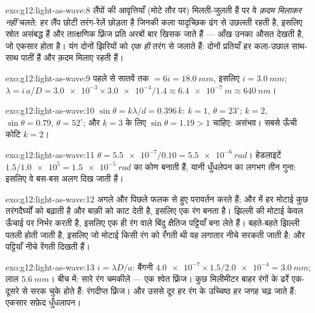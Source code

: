\begin{solution}{exo:g12:light-as-wave:8}
लैंपों की आवृत्तियाँ (मोटे तौर पर) मिलती-जुलती हैं पर वे \emph{क़दम मिलाकर
नहीं} चलते: हर लैंप छोटी तरंग-रेलें छोड़ता है जिनकी कला यादृच्छिक ढंग
से उछलती रहती है, इसलिए स्रोत असंबद्ध हैं और तात्क्षणिक फ़्रिंज प्रति 
अरबों बार खिसक जाते हैं --- आँख उनका औसत देखती है, जो एकसार होता है। यंग
दोनों झिरियों को \emph{एक ही} तरंग से जलाते हैं: दोनों प्रतियाँ हर
कला-उछाल साथ-साथ पातीं हैं और क़दम मिलाए रहती हैं।
\end{solution}

\begin{solution}{exo:g12:light-as-wave:9}
पहले से सातवें तक $= 6i = \qty{18.0}{mm}$, इसलिए $i = \qty{3.0}{mm}$; $\lambda = i\,a/D = \num{3.0e-3} \times \num{3.0e-4}/1.4 \approx
\qty{6.4e-7}{m} \approx \qty{640}{nm}$।
\end{solution}

\begin{solution}{exo:g12:light-as-wave:10}
$\sin\theta = k\lambda/d = 0.396\,k$: $k = 1$, $\theta = 23^\circ$; $k = 2$, $\sin\theta = 0.79$, $\theta = 52^\circ$; और $k = 3$ के लिए $\sin\theta = 1.19 > 1$
चाहिए: असंभव। सबसे ऊँची कोटि $k = 2$।
\end{solution}

\begin{solution}{exo:g12:light-as-wave:11}
$\theta = \num{5.5e-7}/0.10 = \qty{5.5e-6}{rad}$। हेडलाइटें $1.5/\num{1.0e5} = \qty{1.5e-5}{rad}$ का कोण बनाती हैं, यानी धुँधलेपन का लगभग तीन गुना:
इसलिए वे बस-बस अलग दिख जाती हैं।
\end{solution}

\begin{solution}{exo:g12:light-as-wave:12}
अगले और पिछले फलक से हुए परावर्तन  करते हैं; और  में हर मोटाई कुछ तरंगदैर्घ्यों को बढ़ाती है और बाक़ी को काट
देती है, इसलिए एक रंग बनता है। झिल्ली की मोटाई केवल ऊँचाई पर निर्भर करती है,
इसलिए एक ही रंग वाले बिंदु क्षैतिज पट्टियाँ बना लेते हैं। बहते-बहते झिल्ली
पतली होती जाती है, इसलिए जो मोटाई किसी रंग को रँगती थी वह लगातार नीचे
सरकती जाती है: और पट्टियाँ नीचे रेंगती दिखती हैं।
\end{solution}

\begin{solution}{exo:g12:light-as-wave:13}
$i = \lambda D/a$: बैंगनी $\num{4.0e-7} \times 1.5/\num{2.0e-4} =
\qty{3.0}{mm}$; लाल $\qty{5.6}{mm}$। बीच में: सारे रंग चमकीले --- एक श्वेत
फ़्रिंज। कुछ मिलीमीटर बाहर रंगों के ढर्रे एक-दूसरे से सरक चुके होते हैं:
रंगदीप्त फ़्रिंज। और उससे दूर हर रंग के उच्चिष्ठ हर जगह चढ़ जाते हैं: एकसार
सफ़ेद धुँधलापन।
\end{solution}


